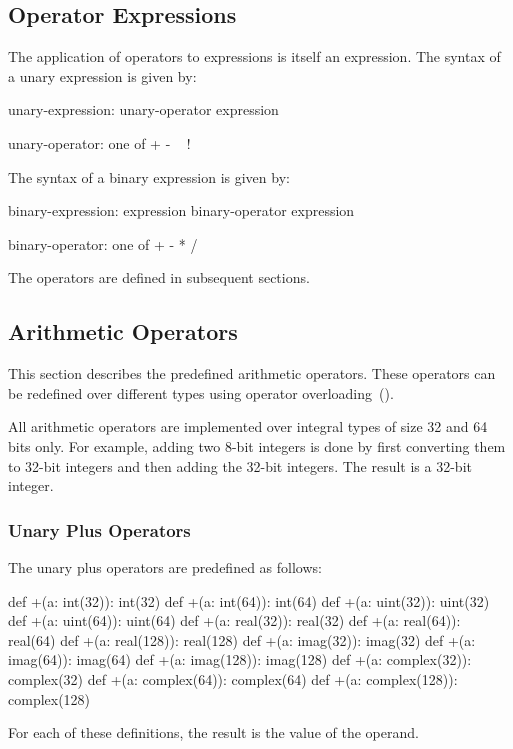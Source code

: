 \subsection{Operator Expressions}
\label{Binary_Expressions}
\label{Unary_Expressions}

The application of operators to expressions is itself an expression.
The syntax of a unary expression is given by:
\begin{syntax}
unary-expression:
  unary-operator expression

unary-operator: one of
  + - ~ !
\end{syntax}

The syntax of a binary expression is given by:
\begin{syntax}
binary-expression:
  expression binary-operator expression

binary-operator: one of
  + - * / %
\end{syntax}

The operators are defined in subsequent sections.

\subsection{Arithmetic Operators}
\label{Arithmetic_Operators}

This section describes the predefined arithmetic operators.  These
operators can be redefined over different types using operator
overloading~().

All arithmetic operators are implemented over integral types of size
32 and 64 bits only.  For example, adding two 8-bit integers is done
by first converting them to 32-bit integers and then adding the 32-bit
integers.  The result is a 32-bit integer.

\subsubsection{Unary Plus Operators}
\label{Unary_Plus_Operators}

The unary plus operators are predefined as follows:
\begin{chapel}
def +(a: int(32)): int(32)
def +(a: int(64)): int(64)
def +(a: uint(32)): uint(32)
def +(a: uint(64)): uint(64)
def +(a: real(32)): real(32)
def +(a: real(64)): real(64)
def +(a: real(128)): real(128)
def +(a: imag(32)): imag(32)
def +(a: imag(64)): imag(64)
def +(a: imag(128)): imag(128)
def +(a: complex(32)): complex(32)
def +(a: complex(64)): complex(64)
def +(a: complex(128)): complex(128)
\end{chapel}
For each of these definitions, the result is the value of the operand.


